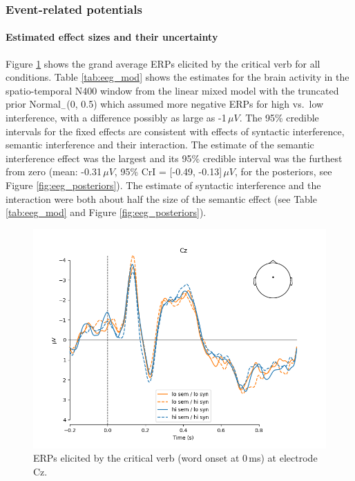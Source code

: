 \documentclass[a4paper, man, floatsintext]{apa7}
\begin{document}
\subsubsection{Event-related potentials}

\paragraph{Estimated effect sizes and their uncertainty}

Figure \ref{fig:erp_all} shows the 
grand average ERPs elicited by the critical verb for all conditions. Table \ref{tab:eeg_mod} shows the estimates for the brain activity in the spatio-temporal N400 window from the linear mixed model with the truncated prior Normal$_-$(0, 0.5) which assumed more negative ERPs for high vs.\ low interference, with a difference possibly as large as -1\,$\mu V$. The 95\% credible intervals for the fixed effects are consistent with effects of syntactic interference, semantic interference and their interaction. The estimate of the semantic interference effect was the largest and its 95\% credible interval was the furthest from zero (mean: -0.31\,$\mu V$, 95\% CrI = [-0.49, -0.13]\,$\mu V$, for the posteriors, see Figure \ref{fig:eeg_posteriors}). The estimate of syntactic interference and the interaction were both about half the size of the semantic effect (see Table \ref{tab:eeg_mod} and Figure \ref{fig:eeg_posteriors}).

\begin{figure}[H]
    \caption{ERPs elicited by the critical verb (word onset at 0\,ms) at electrode Cz.}
    \label{fig:erp_all}
    \centering
    \includegraphics[width=\textwidth]{images/N_103_Cz_crit.png}
\end{figure}
\end{document}
